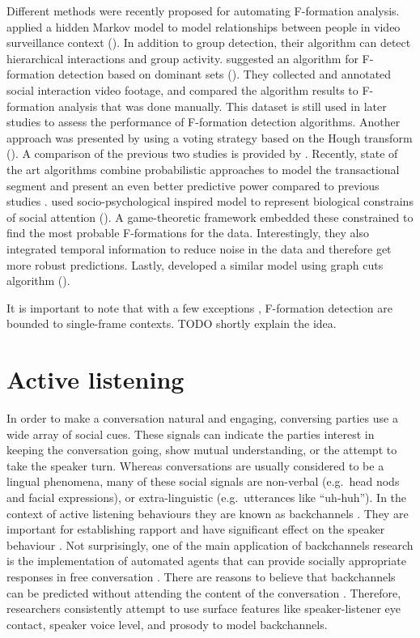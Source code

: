\documentclass[]{simple-thesis}
\begin{document}
Different methods were recently proposed for automating F-formation analysis.
\citeauthor{Lin2010} applied a hidden Markov model to model relationships between people in video surveillance context (\citeyear{Lin2010}).
In addition to group detection, their algorithm can detect hierarchical interactions and group activity.
\citeauthor{Hung2011} suggested an algorithm for F-formation detection based on dominant sets (\citeyear{Hung2011}).
They collected and annotated social interaction video footage, and compared the algorithm results to F-formation analysis that was done manually.
This dataset is still used in later studies to assess the performance of F-formation detection algorithms.
Another approach was presented by \citeauthor{Cristani2011} using a voting strategy based on the Hough transform (\citeyear{Cristani2011}).
A comparison of the previous two studies is provided by \cite{Setti2013}.
Recently, state of the art algorithms combine probabilistic approaches to model the transactional segment and present an even better predictive power compared to previous studies \citep{Vascon2014, Setti2015}.
\citeauthor{Vascon2014} used socio-psychological inspired model to represent biological constrains of social attention (\citeyear{Vascon2014}).
A game-theoretic framework embedded these constrained to find the most probable F-formations for the data.
Interestingly, they also integrated temporal information to reduce noise in the data and therefore get more robust predictions.
Lastly, \citeauthor{Setti2015} developed a similar model using graph cuts algorithm (\citeyear{Setti2015}).

It is important to note that with a few exceptions \citep{Mead2011, Vascon2014}, F-formation detection are bounded to single-frame contexts.
TODO shortly explain the idea.

\section{Active listening}

In order to make a conversation natural and engaging, conversing parties use a wide array of social cues.
These signals can indicate the parties interest in keeping the conversation going, show mutual understanding, or the attempt to take the speaker turn.
Whereas conversations are usually considered to be a lingual phenomena, many of these social signals are non-verbal (e.g.\ head nods and facial expressions), or extra-linguistic (e.g.\ utterances like ``uh-huh'').
In the context of active listening behaviours they are known as backchannels \citep{Yngve1970}.
They are important for establishing rapport \citep{Gratch2007} and have significant effect on the speaker behaviour \citep{Bavelas2000}.
Not surprisingly, one of the main application of backchannels research is the implementation of automated agents that can provide socially appropriate responses in free conversation \citep{Morency2008, Bevacqua2008}.
There are reasons to believe that backchannels can be predicted without attending the content of the conversation \citep{Yngve1970}.
Therefore, researchers consistently attempt to use surface features like speaker-listener eye contact, speaker voice level, and prosody to model backchannels.
\end{document}
